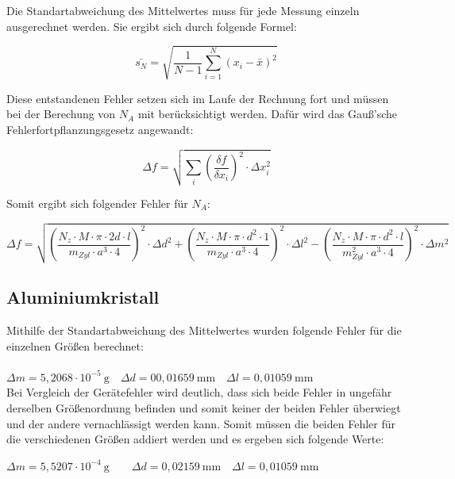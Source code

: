 \documentclass[12pt,a4paper,titlepage,headinclude,bibtotoc]{scrartcl}
\begin{document}
Die Standartabweichung des Mittelwertes muss für jede Messung einzeln ausgerechnet werden. Sie ergibt sich durch folgende Formel:

\begin{equation}
\bar{s_N}=\sqrt{\frac{1}{N-1}\sum_{i=1}^N (x_i -\bar{x})^2}
\end{equation}

Diese entstandenen Fehler setzen sich im Laufe der Rechnung fort und müssen bei der Berechung von $N_A$ mit berücksichtigt werden. Dafür wird das Gauß'sche Fehlerfortpflanzungsgesetz angewandt:

\begin{equation}
\Delta f =\sqrt{\sum_{i} \left( \frac{\delta f}{\delta x_i}\right)^2 \cdot\Delta x^2_i }
\end{equation}

Somit ergibt sich folgender Fehler für $N_A$:

\begin{equation}
\Delta f = \sqrt{\left(\frac{N_z \cdot M \cdot \pi \cdot 2d \cdot l}{m_{Zyl} \cdot a^3 \cdot 4}\right)^2 \cdot \Delta d^2 + \left(\frac{N_z \cdot M \cdot \pi \cdot d^2 \cdot 1}{m_{Zyl} \cdot a^3 \cdot 4}\right)^2 \cdot \Delta l^2 - \left(\frac{N_z \cdot M \cdot \pi \cdot d^2 \cdot l}{m_{Zyl}^2 \cdot a^3 \cdot 4}\right)^2 \cdot \Delta m^2}
\end{equation}

\subsection{Aluminiumkristall}
 
Mithilfe der Standartabweichung des Mittelwertes wurden folgende Fehler für die einzelnen Größen berechnet:
\\
\\
$\Delta m = 5,2068\cdot10^{-5} \ \mathrm{g} \quad \Delta d= 00,01659 \ \mathrm{mm} \quad \Delta l = 0,01059\ \mathrm{mm}$\\

\vspace{3mm}
Bei Vergleich der Gerätefehler wird deutlich, dass sich beide Fehler in ungefähr derselben Größenordnung befinden und somit keiner der beiden Fehler überwiegt und der andere vernachlässigt werden kann. Somit müssen die beiden Fehler für die verschiedenen Größen addiert werden und es ergeben sich folgende Werte:

\vspace{3mm} 
$\Delta m =5,5207\cdot 10^{-4}\ \mathrm{g} \qquad\Delta d =0,02159\ \mathrm{mm}\quad \Delta l = 0,01059\ \mathrm{mm}$
\vspace{3mm}
 
\end{document}
